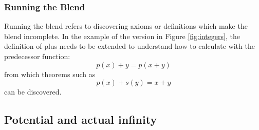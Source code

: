 \subsubsection{Running the Blend}

Running the blend refers to discovering axioms or definitions which
make the blend incomplete. In the example of the version in Figure
\ref{fig:integers}, the definition of plus needs to be extended to
understand how to calculate with the predecessor function:
$$
p(x) + y = p(x+y)
$$
\noindent from which theorems such as 
$$
p(x) + s(y) = x+y
$$
\noindent can be discovered.


\subsection{Potential and actual infinity}


